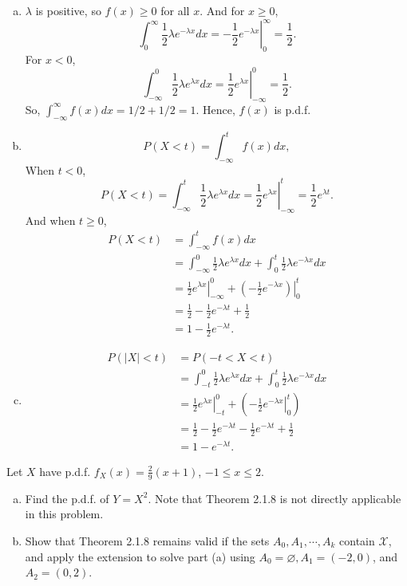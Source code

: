 \documentclass[14pt]{elegantbook}
\begin{document}
    \begin{solution}
        \begin{enumerate}[(a)]
            \item $\lambda$ is positive, so $f(x)\geq 0$ for all $x$. And for $x\geq 0$, 
            \[\int_{0}^\infty\frac{1}{2}\lambda e^{-\lambda x} dx=\left.-\frac{1}{2}e^{-\lambda x}\right|_0^\infty=\frac{1}{2}. \]
            For $x< 0$, 
            \[\int_{-\infty}^0\frac{1}{2}\lambda e^{\lambda x} dx=\left.\frac{1}{2}e^{\lambda x}\right|_{-\infty}^0=\frac{1}{2}. \]
            So, $\int_{-\infty}^\infty f(x) dx=1/2+1/2=1$. Hence, $f(x)$ is p.d.f. 
            \item \[P(X<t)=\int_{-\infty}^t f(x) dx, \]
            When $t<0$, 
            \[
                P(X<t)=\int_{-\infty}^t \frac{1}{2}\lambda e^{\lambda x} dx = \left.\frac{1}{2}e^{\lambda x}\right|_{-\infty}^t=\frac{1}{2}e^{\lambda t}.
            \]
            And when $t\geq 0$, 
            \begin{align*}
                P(X<t)&=\int_{-\infty}^t f(x) dx\\
                &=\int_{-\infty}^0 \frac{1}{2}\lambda e^{\lambda x} dx+\int_0^t \frac{1}{2}\lambda e^{-\lambda x} dx\\
                &=\left.\frac{1}{2}e^{\lambda x}\right|_{-\infty}^0+\left.\left(-\frac{1}{2}e^{-\lambda x}\right)\right|_0^t\\
                &=\frac{1}{2}-\frac{1}{2}e^{-\lambda t}+\frac{1}{2}\\
                &=1-\frac{1}{2}e^{-\lambda t}.
            \end{align*}
            \item \begin{align*}
                P(|X|<t)&=P(-t<X<t)\\
                &=\int_{-t}^0\frac{1}{2}\lambda e^{\lambda x} dx+\int_0^t\frac{1}{2}\lambda e^{-\lambda x} dx\\
                &=\left.\frac{1}{2}e^{\lambda x}\right|_{-t}^0+\left(\left.-\frac{1}{2}e^{-\lambda x}\right|_0^t\right)\\
                &=\frac{1}{2}-\frac{1}{2}e^{-\lambda t}-\frac{1}{2}e^{-\lambda t}+\frac{1}{2}\\
                &=1-e^{-\lambda t}.
            \end{align*}
        \end{enumerate}
    \end{solution}

    \setcounter{exer}{6}
    \begin{exercise}
        Let $X$ have p.d.f. $f_X(x)=\frac{2}{9}(x+1)$, $-1\leq x\leq 2$. 
        \begin{enumerate}[(a)]
            \item Find the p.d.f. of $Y=X^2$. Note that Theorem 2.1.8 is not directly applicable in this problem. 
            \item Show that Theorem 2.1.8 remains valid if the sets $A_0, A_1, \cdots, A_k$ contain $\mathcal{X}$, and apply the extension to solve part (a) using $A_0=\varnothing, A_1=(-2,0)$, and $A_2=(0,2)$. 
        \end{enumerate}
    \end{exercise}
\end{document}
